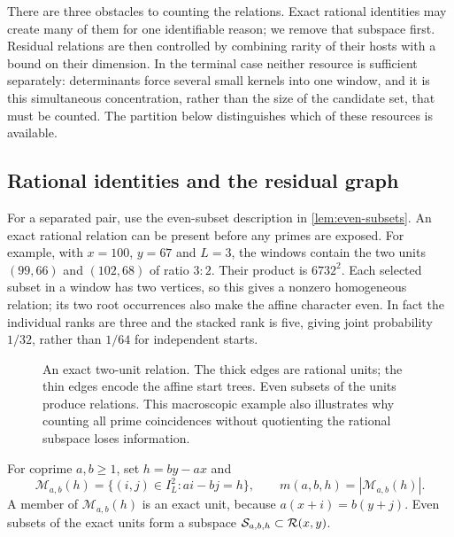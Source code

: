 There are three obstacles to counting the relations. Exact rational
identities may create many of them for one identifiable reason; we remove
that subspace first. Residual relations are then controlled by combining
rarity of their hosts with a bound on their dimension. In the terminal
case neither resource is sufficient separately: determinants force
several small kernels into one window, and it is this simultaneous
concentration, rather than the size of the candidate set, that must be
counted. The partition below distinguishes which of these resources is
available.


\subsection{Rational identities and the residual graph}
For a separated pair, use the even-subset description in
\cref{lem:even-subsets}. An exact rational relation can be present before
any primes are exposed. For example, with $x=100$, $y=67$ and $L=3$, the
windows contain the two units $(99,66)$ and $(102,68)$ of ratio $3:2$.
Their product is $6732^2$. Each selected subset in a window has two vertices,
so this gives a nonzero homogeneous relation; its two root occurrences also
make the affine character even. In fact the individual ranks are three and
the stacked rank is five, giving joint probability $1/32$, rather than
$1/64$ for independent starts.

\begin{figure}[htbp]\centering
{}
\caption{An exact two-unit relation. The thick edges are rational units;
the thin edges encode the affine start trees. Even subsets of the units
produce relations. This macroscopic example also illustrates why counting
all prime coincidences without quotienting the rational subspace loses
information.}\label{fig:rational-example}
\end{figure}
For coprime $a,b\geq1$, set $h=by-ax$ and
\[
 \mathcal M_{a,b}(h)=\{(i,j)\in I_L^2:ai-bj=h\},
 \qquad m(a,b,h)=|\mathcal M_{a,b}(h)|.
\]
A member of $\mathcal M_{a,b}(h)$ is an exact unit, because
$a(x+i)=b(y+j)$.  Even subsets of the exact units form a subspace
$\mathcal S_{a,b,h}\subset\mathcal R(x,y)$.

